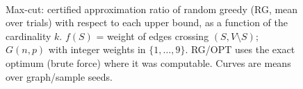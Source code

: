 \begin{figure}[t]
\centering
\setlength{\rgplotwidth}{0.245\textwidth}
\\[1pt]

\caption{Max-cut: certified approximation ratio of random greedy (RG, mean over trials) with respect to each upper bound, as a function of the cardinality $k$. $f(S)$ = weight of edges crossing $(S, V\setminus S)$; $G(n,p)$ with integer weights in $\{1,\dots,9\}$. RG/OPT uses the exact optimum (brute force) where it was computable. Curves are means over graph/sample seeds.}
\label{fig:rg-max_cut-wide}
\end{figure}
